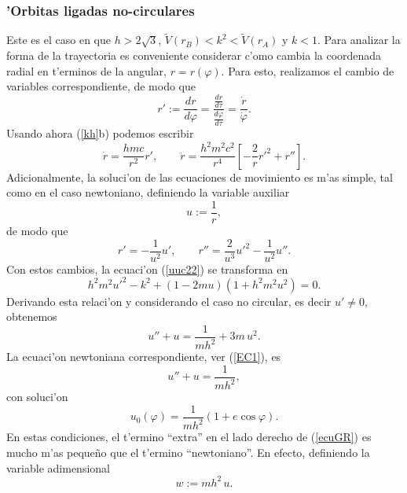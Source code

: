 \subsubsection{'Orbitas ligadas no-circulares}
Este es el caso en que $h>2\sqrt{3}$, $\tilde{V}(r_B)<k^2<\tilde{V}(r_A)$ y $k<1$. Para analizar la forma de la trayectoria es conveniente considerar c'omo cambia la coordenada radial en t'erminos de la angular, $r=r(\varphi)$. Para esto, realizamos el cambio de variables correspondiente, de modo que
\begin{equation}
r':=\frac{dr}{d\varphi}=\frac{\frac{dr}{d\tau}}{\frac{d\varphi}{d\tau}}=\frac{
\dot{r}}{\dot{\varphi}}.
\end{equation}
Usando ahora (\ref{kh}b) podemos escribir
\begin{equation}
\dot{r} =\frac{hmc}{r^2}r', \qquad \ddot{r}=\frac{h^2m^2c^2}{r^4}\left[-\frac{2}{r}r'^2+r''\right].
\end{equation}
Adicionalmente, la soluci'on de las ecuaciones de movimiento es m'as simple, tal como en el caso newtoniano, definiendo la variable auxiliar
\begin{equation}
 u:=\frac{1}{r},
\end{equation}
de modo que
\begin{equation}
r' =-\frac{1}{u^2} u',  \qquad r''=\frac{2}{u^3}u'^2-\frac{1}{u^2}u''.
\end{equation}
Con estos cambios, la ecuaci'on (\ref{uuc22})  se transforma en
\begin{equation}
h^2m^2u'^2-k^2+(1-2mu)(1+h^2m^2u^2)=0.
\end{equation}
Derivando esta relaci'on y considerando el caso no circular, es decir $u'\neq 0$, obtenemos
\begin{equation}
u''+u=\frac{1}{mh^2}+3m\,u^2 \label{ecuGR}.
\end{equation}
La ecuaci'on newtoniana correspondiente, ver (\ref{EC1}),  es
\begin{equation}
 u''+u=\frac{1}{mh^2},\label{ecrNew}
\end{equation}
con soluci'on
\begin{equation}
 u_0(\varphi)=\frac{1}{mh^2}\left(1+e\cos\varphi\right).
\end{equation}
En estas condiciones, el t'ermino ``extra'' en el lado derecho de (\ref{ecuGR}) es mucho m'as peque\~no que el t'ermino ``newtoniano''. En efecto, definiendo la variable adimensional
\begin{equation}
 w:=mh^2\,u.
\end{equation}

